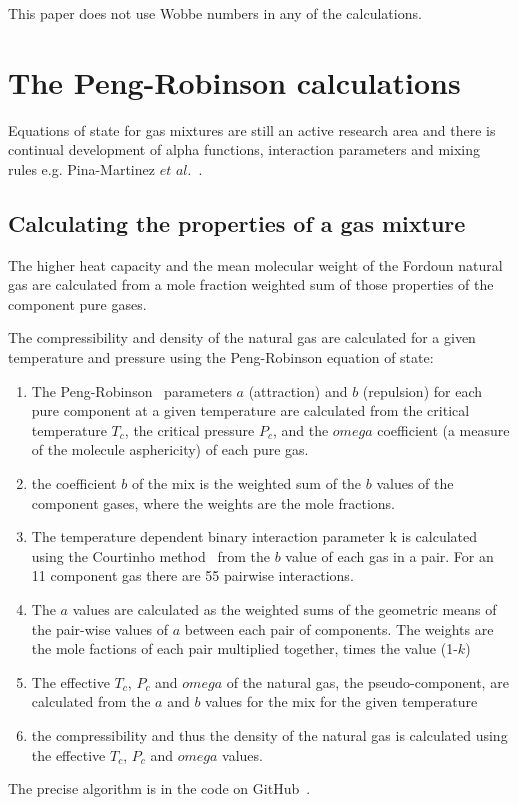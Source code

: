 \documentclass[5p]{elsarticle} %
\begin{document}
This paper does not use Wobbe numbers in any of the calculations. 

\section{The Peng-Robinson calculations}

Equations of state for gas mixtures are still an active research area and there is continual development of alpha functions, interaction parameters and mixing rules e.g. Pina-Martinez $et$ $al.$~\citep{Pina-Martinez2019}.

\subsection{Calculating the properties of a gas mixture}
\label{sec:gasmix}
The higher heat capacity and the mean molecular weight of the Fordoun natural gas are calculated from a mole fraction weighted sum of those properties of the component pure gases.

The compressibility and density of the natural gas are calculated for a given temperature and pressure using the Peng-Robinson equation of state: 

\begin{enumerate}
\item The Peng-Robinson~\citep{Pina-Martinez2019} parameters $a$ (attraction) and $b$ (repulsion) for each pure component  at a given temperature are calculated from the critical temperature $T_c$, the critical pressure $P_c$, and the $omega$ coefficient (a measure of the molecule asphericity) of each pure gas.
    \item the coefficient $b$ of the mix is   the weighted sum of the $b$ values of the component gases, where the weights are the mole fractions. 
    \item The temperature dependent binary interaction parameter k is calculated using the Courtinho method~\cite{Privat2023} from the $b$ value of each gas in a pair. For an 11 component gas there are 55 pairwise interactions.
    \item The $a$ values are calculated as the weighted sums of the geometric means of the pair-wise values of $a$ between each pair of components. The weights are the mole factions of each pair multiplied together, times the value (1-$k$)
    \item The effective $T_c$, $P_c$ and $omega$ of the natural gas, the pseudo-component,  are calculated from the $a$ and $b$ values for the mix for the given temperature
    \item the compressibility and thus the density of the natural gas is calculated using the effective $T_c$, $P_c$ and $omega$ values.
\end{enumerate}
The precise algorithm is in the code on GitHub~\cite{Sargents_github}.
\end{document}
